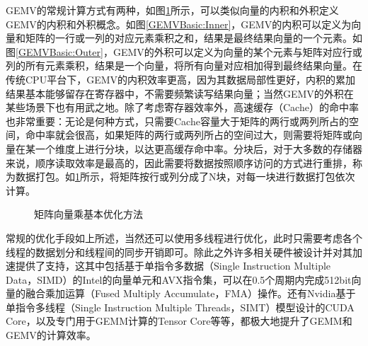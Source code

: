 GEMV的常规计算方式有两种，如图\ref{GEMVBasic}所示，可以类似向量的内积和外积定义GEMV的内积和外积概念。如图\ref{GEMVBasic:Inner}，GEMV的内积可以定义为向量和矩阵的一行或一列的对应元素乘积之和，结果是最终结果向量的一个元素。如图\ref{GEMVBasic:Outer}，GEMV的外积可以定义为向量的某个元素与矩阵对应行或列的所有元素乘积，结果是一个向量，将所有向量对应相加得到最终结果向量。在传统CPU平台下，GEMV的内积效率更高，因为其数据局部性更好，内积的累加结果基本能够留存在寄存器中，不需要频繁读写结果向量；当然GEMV的外积在某些场景下也有用武之地。除了考虑寄存器效率外，高速缓存（Cache）的命中率也非常重要：无论是何种方式，只需要Cache容量大于矩阵的两行或两列所占的空间，命中率就会很高，如果矩阵的两行或两列所占的空间过大，则需要将矩阵或向量在某一个维度上进行分块，以达更高缓存命中率。分块后，对于大多数的存储器来说，顺序读取效率是最高的，因此需要将数据按照顺序访问的方式进行重排，称为数据打包。如\ref{GEMVBasic}所示，将矩阵按行或列分成了N块，对每一块进行数据打包依次计算。

\begin{figure}[htbp!]
	\centering
	\label{GEMVBasic}
	\caption{矩阵向量乘基本优化方法}
\end{figure}

常规的优化手段如上所述，当然还可以使用多线程进行优化，此时只需要考虑各个线程的数据划分和线程间的同步开销即可。除此之外许多相关硬件被设计并对其加速提供了支持，这其中包括基于单指令多数据（Single Instruction Multiple Data，SIMD）的Intel的向量单元和AVX指令集，可以在0.5个周期内完成512bit向量的融合乘加运算（Fused Multiply Accumulate，FMA）操作\cite{IntelAVX}。还有Nvidia基于单指令多线程（Single Instruction Multiple Threads，SIMT）模型设计的CUDA Core\cite{Cuda}，以及专门用于GEMM计算的Tensor Core\cite{TensorCore}等等，都极大地提升了GEMM和GEMV的计算效率。

